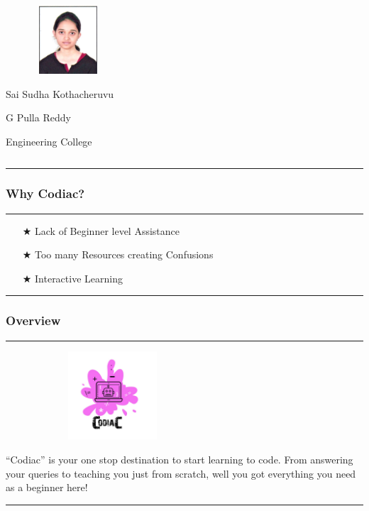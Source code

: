 \documentclass[14pt]{beamer}
\begin{document}
\begin{frame}
\begin{columns}
        \begin{column}{0.2\textwidth}
            \begin{figure}[htbp]
            \centerline{\includegraphics[width=1in, height=1in]{./Codiac/logos/sudha.jpeg}}
            \end{figure}
             \begin{spacing}{0.5}
                \centerline {\tiny Sai Sudha Kothacheruvu}
                 \centerline {\tiny G Pulla Reddy}
                  \centerline {\tiny Engineering College}
                  \end{spacing}
        \end{column}
        
    \end{columns}
    \noindent
    {\color{pink} \rule{\linewidth}{0.7mm}}
\end{frame}



\begin{frame}
    \frametitle{Why Codiac?}
    \noindent
    {\color{pink} \rule{\linewidth}{0.7mm} }
    \begin{itemize}
    \item [$\bigstar$] Lack of Beginner level Assistance \\
    \item [$\bigstar$] Too many Resources creating Confusions \\  
   \item [$\bigstar$] Interactive Learning \\
    \end{itemize}
    \noindent
     {\color{pink} \rule{\linewidth}{0.7mm}}
\end{frame}


\begin{frame}
\frametitle{Overview}
\noindent
{\color{pink} \rule{\linewidth}{0.7mm} }
     \begin{figure}[htbp]
      \centerline{\includegraphics[width=2.3in, height=1.3in]{./Codiac/logos/logo.jpeg}}
     \end{figure}
\small ``Codiac'' is your one stop destination to start learning to code. From answering your queries to teaching you just from scratch, well you got everything you need as a beginner here!
\noindent
{\color{pink} \rule{\linewidth}{0.7mm} } 
\end{frame}   
\end{document}
